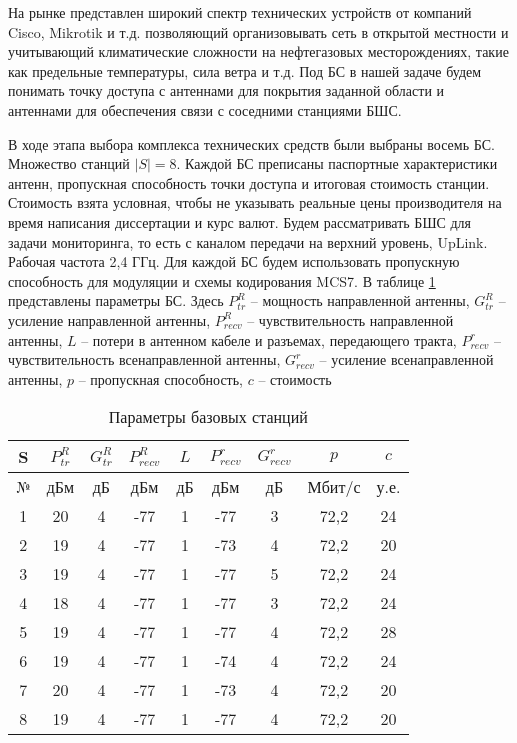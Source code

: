 На рынке представлен широкий спектр технических устройств от компаний Cisco, Mikrotik и т.д. позволяющий организовывать сеть в открытой местности и учитывающий климатические сложности на нефтегазовых месторождениях, такие как предельные температуры, сила ветра и т.д. Под БС в нашей задаче будем понимать точку доступа с антеннами для покрытия заданной области и антеннами для обеспечения связи с соседними станциями БШС. 

В ходе этапа выбора комплекса технических средств были выбраны восемь БС. Множество станций $|S| = 8$. Каждой БС преписаны паспортные характеристики антенн, пропускная способность точки доступа и итоговая стоимость станции. Стоимость взята условная, чтобы не указывать реальные цены производителя на время написания диссертации и курс валют. Будем рассматривать БШС для задачи мониторинга, то есть с каналом передачи на верхний уровень, UpLink. Рабочая частота 2,4 ГГц. Для каждой БС будем использовать пропускную способность для модуляции и схемы кодирования MCS7.  В таблице \cref{tab:sta_parameters} представлены параметры БС. Здесь $P_{tr}^{R}$ -- мощность направленной антенны, $G_{tr}^R$ -- усиление направленной антенны, $P_{recv}^R$ -- чувствительность направленной антенны, $L$  -- потери в антенном кабеле и разъемах, передающего тракта, $P_{recv}^r$ -- чувствительность всенаправленной антенны, $G_{recv}^r$ -- усиление всенаправленной антенны,  $p$ – пропускная способность, $c$ – стоимость


\begin{table}[h!]\centering
  \begin{tabular}{|c||c|c|c|c|c|c|c|c|}\hline
      
      S&	$P_{tr}^R$&	$G_{tr}^R$&	$P_{recv}^R$&	$L$&	$P_{recv}^r$&	$G_{recv}^r$&	$p$&	$c$ \\
      \hline
      №&	дБм&	дБ&	дБм&	дБ&	дБм&	дБ&	Мбит/с&	у.е. \\
      \hline
      1&	20&	4&	-77&	1&	-77&	3&	72,2& 24 \\
      2&	19&	4&	-77&	1&	-73&	4&	72,2&	20 \\
      3&	19&	4&	-77&	1&	-77&	5&	72,2&	24 \\
      4&	18&	4&	-77&	1&	-77&	3&	72,2&	24 \\
      5&	19&	4&	-77&	1&	-77&	4&	72,2&	28 \\
      6&	19&	4&	-77&	1&	-74&	4&	72,2&	24 \\
      7&	20&	4&	-77&	1&	-73&	4&	72,2&	20 \\
      8&	19&	4&	-77&	1&	-77&	4&	72,2&	20 \\
      \hline

\end{tabular}\caption{Параметры базовых станций}\label{tab:sta_parameters}
\end{table}

